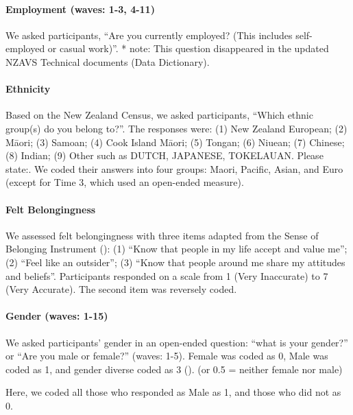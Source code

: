 \documentclass[
  singlecolumn]{article}
\let\oldparagraph\paragraph
\renewcommand{\paragraph}[1]{\oldparagraph{#1}\mbox{}}
\begin{document}
\paragraph{Employment (waves: 1-3,
4-11)}\label{employment-waves-1-3-4-11}

We asked participants, ``Are you currently employed? (This includes
self-employed or casual work)''. * note: This question disappeared in
the updated NZAVS Technical documents (Data Dictionary).

\paragraph{Ethnicity}\label{ethnicity}

Based on the New Zealand Census, we asked participants, ``Which ethnic
group(s) do you belong to?''. The responses were: (1) New Zealand
European; (2) Māori; (3) Samoan; (4) Cook Island Māori; (5) Tongan; (6)
Niuean; (7) Chinese; (8) Indian; (9) Other such as DUTCH, JAPANESE,
TOKELAUAN. Please state:. We coded their answers into four groups:
Maori, Pacific, Asian, and Euro (except for Time 3, which used an
open-ended measure).

\paragraph{Felt Belongingness}\label{felt-belongingness}

We assessed felt belongingness with three items adapted from the Sense
of Belonging Instrument (): (1) ``Know that people in my life accept and value me''; (2)
``Feel like an outsider''; (3) ``Know that people around me share my
attitudes and beliefs''. Participants responded on a scale from 1 (Very
Inaccurate) to 7 (Very Accurate). The second item was reversely coded.

\paragraph{Gender (waves: 1-15)}\label{gender-waves-1-15}

We asked participants' gender in an open-ended question: ``what is your
gender?'' or ``Are you male or female?'' (waves: 1-5). Female was coded
as 0, Male was coded as 1, and gender diverse coded as 3
(). (or 0.5
= neither female nor male)

Here, we coded all those who responded as Male as 1, and those who did
not as 0.
\end{document}
